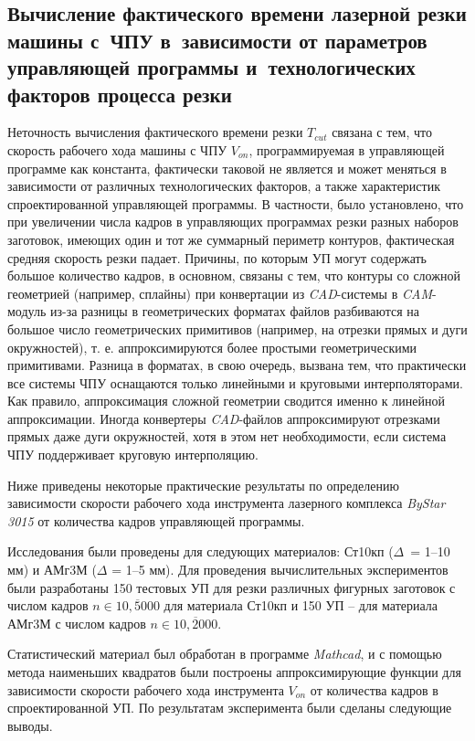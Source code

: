 
\subsection{
  Вычисление фактического времени лазерной резки
  машины с~ЧПУ
  в~зависимости от параметров управляющей программы
  и~технологических факторов процесса резки
}
\label{sect:2.1.1}

Неточность вычисления фактического времени резки
$T_{cut}$
связана с тем, что скорость рабочего хода машины с ЧПУ
$V_{on}$,
программируемая в управляющей программе как константа,
фактически таковой не является и может меняться
в зависимости от различных технологических факторов,
а также характеристик спроектированной управляющей программы.
В частности, было установлено,
что при увеличении числа кадров в управляющих программах
резки разных наборов заготовок,
имеющих один и тот же суммарный периметр контуров,
фактическая средняя скорость резки падает.
Причины, по которым УП могут содержать большое количество кадров,
в основном, связаны с тем, что контуры со сложной геометрией
(например, сплайны) при конвертации из
{\it CAD}-системы в
{\it CAM}-модуль из-за разницы в геометрических форматах файлов
разбиваются на большое число геометрических примитивов
(например, на отрезки прямых и дуги окружностей),
т. е. аппроксимируются более простыми геометрическими примитивами.
Разница в форматах, в свою очередь,
вызвана тем, что практически все системы ЧПУ
оснащаются только линейными и круговыми интерполяторами.
Как правило, аппроксимация сложной геометрии сводится
именно к линейной аппроксимации.
Иногда конвертеры
{\it CAD}-файлов аппроксимируют отрезками прямых
даже дуги окружностей, хотя в этом нет необходимости,
если система ЧПУ поддерживает круговую интерполяцию.

Ниже приведены некоторые практические результаты
по определению зависимости скорости рабочего хода
инструмента лазерного комплекса
{\it ByStar 3015}
от количества кадров управляющей программы.

Исследования были проведены для следующих материалов:
Ст10кп ($\Delta$~= 1--10 мм)
и АМг3М ($\Delta$ = 1--5 мм).
Для проведения вычислительных экспериментов были разработаны
150 тестовых УП для резки различных фигурных заготовок с числом кадров
$n \in \overline{10,5000}$
для материала Ст10кп
и 150 УП -- для материала
АМг3М с числом кадров
$n \in \overline{10,2000}$.

Статистический материал был обработан в программе
{\it Mathcad},
и с помощью метода наименьших квадратов были построены
аппроксимирующие функции для зависимости скорости
рабочего хода инструмента
$V_{on}$
от количества кадров в спроектированной УП.
По результатам эксперимента были сделаны следующие выводы.

